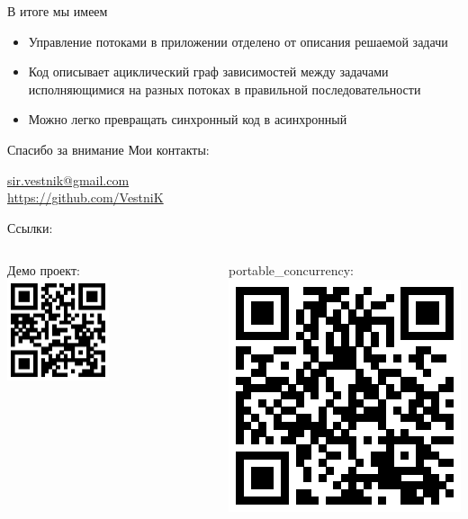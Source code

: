 \documentclass[aspectratio=169,hyperref={unicode},17pt]{beamer}
\begin{document}
\begin{frame}[fragile,t]{В итоге мы имеем}
\begin{itemize}[<+->]
 \item Управление потоками в приложении отделено от описания решаемой задачи
 \item Код описывает ациклический граф зависимостей между задачами исполняющимися на разных потоках в правильной последовательности
 \item Можно легко превращать синхронный код в асинхронный
\end{itemize}
\end{frame}

\begin{frame}[t]{Спасибо за внимание}
Мои контакты:

{\footnotesize{\url{sir.vestnik@gmail.com}}\\
\footnotesize{\url{https://github.com/VestniK}}}

Ссылки:

\begin{columns}
\begin{column}{0.5\textwidth}

{\footnotesize{Демо проект:}}\\
\includegraphics[width=0.5\textwidth]{demo-qr.eps}
\end{column}
\begin{column}{0.5\textwidth}

{\footnotesize{portable\_concurrency:}}\\
\includegraphics[height=0.5\textwidth]{pc-qr.eps}
\end{column}
\end{columns}
\end{frame}
\end{document}
